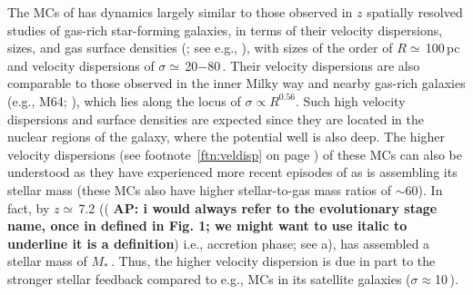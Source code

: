 \IfFileExists{emulateapjlegacy.cls}{\documentclass[iop]{emulateapjlegacy}}{\documentclass[iop]{emulateapj}}
\newcommand{\AP}[1]{({\bf \color{apcolor} AP: #1})}
\begin{document}
The MCs of \flower has dynamics largely similar to those observed in $z$ spatially resolved studies of gas-rich star-forming galaxies, in terms of their velocity dispersions, sizes, and gas surface densities (; see e.g., \citealt{Swinbank11a}), with sizes of the order of $R\simeq$\,100\,pc and velocity dispersions of $\sigma\simeq$\,20$-$80\,\kms.
%
%
Their velocity dispersions are also comparable to those observed in the inner Milky way and nearby gas-rich galaxies (e.g., M64; \citealt{Oka01a, Rosolowsky05a, Heyer09a}), which lies along the locus of $\sigma\propto R^{0.56}$. Such high velocity dispersions and surface densities are expected since they are located in the nuclear regions of the galaxy, where the potential well is also deep. The higher velocity dispersions
(see footnote~\ref{ftn:veldisp} on page \pageref{ftn:veldisp}) of these MCs can also be understood as they have experienced more recent episodes of \SF as \flower is assembling its stellar mass (these MCs also have higher stellar-to-gas mass ratios of $\sim$60).
%
In fact, by $z\simeq$\,7.2 (\AP{i would always refer to the evolutionary stage name, once in defined in Fig. 1; we might want to use italic to underline it is a definition} i.e., accretion phase; see a), \flower has assembled a stellar mass of $M_*$\,\Msun. Thus, the higher velocity dispersion is due in part to the stronger stellar feedback compared to e.g., MCs in its satellite galaxies ($\sigma\approx$10\,\kms).
\end{document}
